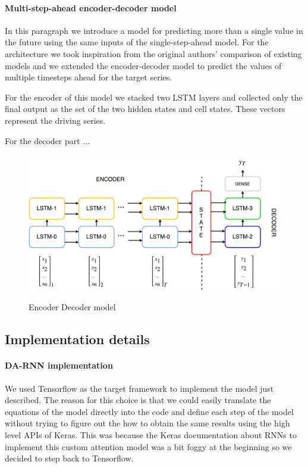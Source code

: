 \documentclass{article}
\begin{document}
\paragraph{Multi-step-ahead encoder-decoder model}

In this paragraph we introduce a model for predicting more than a single value in 
the future using the same inputs of the single-step-ahead model. 
For the architecture we took inspiration from the original authors' comparison of
existing models and we extended the encoder-decoder model to predict the values
of multiple timesteps ahead for the target series.

For the encoder of this model we stacked two LSTM layers and collected only the 
final output as the set of the two hidden states and cell states. These vectors
represent the driving series.

For the decoder part ...

\begin{figure}[ht]
\centering
\includegraphics[width=0.7\linewidth]{img/ende-rnn.png} \\
\caption{Encoder Decoder model}
\label{fig:ende-rnn}
\end{figure}


\subsection{Implementation details}

\paragraph{DA-RNN implementation}

We used Tensorflow as the target framework to implement the model just
described. The reason for this choice is that we
could easily translate the equations of the model directly into the code and
define each step of the model without
trying to figure out the how to obtain the same results using the high level
APIs of Keras. This was because the
Keras documentation about RNNs to implement this custom attention model was a
bit foggy at the beginning so we decided
to step back to Tensorflow. 
\end{document}
